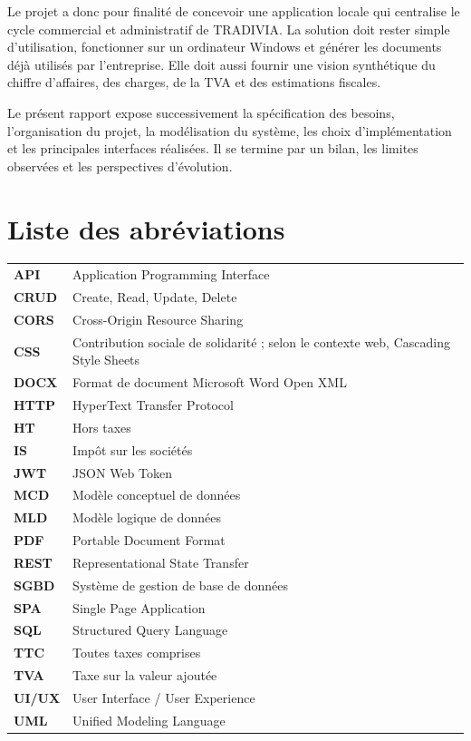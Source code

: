 \documentclass[12pt,a4paper,oneside]{report}
\begin{document}
Le projet a donc pour finalité de concevoir une application locale qui centralise le cycle commercial et administratif de TRADIVIA. La solution doit rester simple d'utilisation, fonctionner sur un ordinateur Windows et générer les documents déjà utilisés par l'entreprise. Elle doit aussi fournir une vision synthétique du chiffre d'affaires, des charges, de la TVA et des estimations fiscales.

Le présent rapport expose successivement la spécification des besoins, l'organisation du projet, la modélisation du système, les choix d'implémentation et les principales interfaces réalisées. Il se termine par un bilan, les limites observées et les perspectives d'évolution.

\chapter*{Liste des abréviations}
\begin{longtable}{p{3cm}p{11cm}}
\textbf{API} & Application Programming Interface\\
\textbf{CRUD} & Create, Read, Update, Delete\\
\textbf{CORS} & Cross-Origin Resource Sharing\\
\textbf{CSS} & Contribution sociale de solidarité ; selon le contexte web, Cascading Style Sheets\\
\textbf{DOCX} & Format de document Microsoft Word Open XML\\
\textbf{HTTP} & HyperText Transfer Protocol\\
\textbf{HT} & Hors taxes\\
\textbf{IS} & Impôt sur les sociétés\\
\textbf{JWT} & JSON Web Token\\
\textbf{MCD} & Modèle conceptuel de données\\
\textbf{MLD} & Modèle logique de données\\
\textbf{PDF} & Portable Document Format\\
\textbf{REST} & Representational State Transfer\\
\textbf{SGBD} & Système de gestion de base de données\\
\textbf{SPA} & Single Page Application\\
\textbf{SQL} & Structured Query Language\\
\textbf{TTC} & Toutes taxes comprises\\
\textbf{TVA} & Taxe sur la valeur ajoutée\\
\textbf{UI/UX} & User Interface / User Experience\\
\textbf{UML} & Unified Modeling Language\\
\end{longtable}
\end{document}
